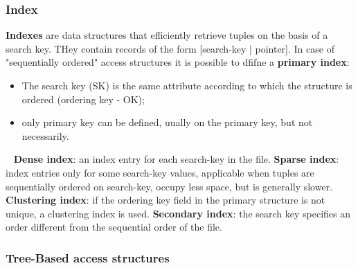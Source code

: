 \subsubsection{Index}
\textbf{Indexes} are data structures that efficiently retrieve tuples on the basis of a search key. THey contain records of the form [search-key | pointer].\newline
\newline
In case of "sequentially ordered" access structures it is possible to dfifne a \textbf{primary index}:
\begin{itemize}
    \item The search key (SK) is the same attribute according to which the structure
    is ordered (ordering key - OK);
    \item only primary key can be defined, uually on the primary key, but not necessarily.
\end{itemize}
\ \newline
\textbf{Dense index}: an index entry for each search-key in the file.\newline
\newline
\textbf{Sparse index}: index entries only for some search-key values, applicable when tuples are sequentially ordered on search-key, occupy less space, but is generally slower.\newline
\newline
\textbf{Clustering index}: if the ordering key field in the primary structure is not unique, a clustering index is used.\newline
\newline
\textbf{Secondary index}: the search key specifies an order different from the sequential order of the file.
\subsubsection{Tree-Based access structures}

